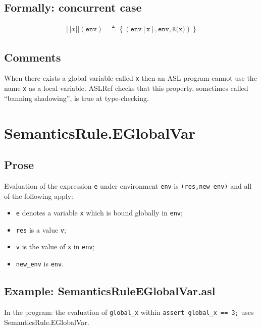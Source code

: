 \documentclass{book}
\newcommand\llbracket{[|}
\newcommand\rrbracket{|]}
\newcommand\interp[1]{\left\llbracket #1 \right\rrbracket}
\begin{document}
  \subsection{Formally: concurrent case}
  \begin{align}
  \interp{x}(\texttt{env}) & \triangleq \left\{ (\texttt{env}[\texttt{x}], \texttt{env}, \texttt{R(x)}) \right\}
  \label{eq:sem-conc-var}
  \end{align} 
 
  \subsection{Comments}
  When there exists a global variable called \texttt{x} then an ASL program
  cannot use the name \texttt{x} as a local variable. ASLRef checks that this
  property, sometimes called ``banning shadowing'', is true at type-checking.

\section{SemanticsRule.EGlobalVar \label{sec:SemanticsRule.EGlobalVar}}

  \subsection{Prose}
  Evaluation of the expression \texttt{e} under environment \texttt{env} is
  \texttt{(res,new\_env)} and all of the following apply:
  \begin{itemize}
  \item \texttt{e} denotes a variable \texttt{x} which is bound globally in \texttt{env};
  \item \texttt{res} is a value \texttt{v};
  \item \texttt{v} is the value of \texttt{x} in \texttt{env};
  \item \texttt{new\_env} is \texttt{env}.
  \end{itemize}

  \subsection{Example: SemanticsRuleEGlobalVar.asl}
    In the program:
    the evaluation of \texttt{global\_x} within \texttt{assert global\_x == 3;}
    uses SemanticsRule.EGlobalVar.

\end{document}

